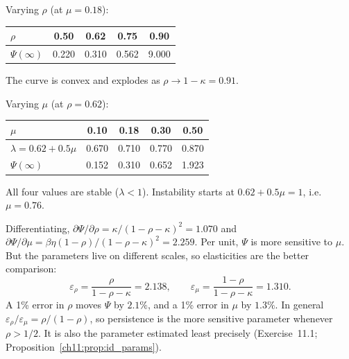 \documentclass[../solutions_manual.tex]{subfiles}
\begin{document}
 Varying $\rho$ (at $\mu = 0.18$):
\begin{center}
\begin{tabular}{lcccc}
\toprule
$\rho$ & 0.50 & 0.62 & 0.75 & 0.90 \\
\midrule
$\Psi(\infty)$ & 0.220 & 0.310 & 0.562 & 9.000 \\
\bottomrule
\end{tabular}
\end{center}
\begin{center}
\end{center}
The curve is convex and explodes as $\rho \to 1 - \kappa = 0.91$.

 Varying $\mu$ (at $\rho = 0.62$):
\begin{center}
\begin{tabular}{lcccc}
\toprule
$\mu$ & 0.10 & 0.18 & 0.30 & 0.50 \\
\midrule
$\lambda = 0.62 + 0.5\mu$ & 0.670 & 0.710 & 0.770 & 0.870 \\
$\Psi(\infty)$ & 0.152 & 0.310 & 0.652 & 1.923 \\
\bottomrule
\end{tabular}
\end{center}
All four values are stable ($\lambda < 1$). Instability starts at $0.62 + 0.5\mu = 1$, i.e.\ $\mu = 0.76$.

 Differentiating, $\partial\Psi/\partial\rho = \kappa/(1-\rho-\kappa)^2 = 1.070$ and $\partial\Psi/\partial\mu = \beta\eta(1-\rho)/(1-\rho-\kappa)^2 = 2.259$. Per unit, $\Psi$ is more sensitive to $\mu$. But the parameters live on different scales, so elasticities are the better comparison:
\[
\varepsilon_\rho = \frac{\rho}{1 - \rho - \kappa} = 2.138, \qquad \varepsilon_\mu = \frac{1-\rho}{1-\rho-\kappa} = 1.310 .
\]
A 1\% error in $\rho$ moves $\Psi$ by $2.1\%$, and a 1\% error in $\mu$ by $1.3\%$. In general $\varepsilon_\rho/\varepsilon_\mu = \rho/(1-\rho)$, so persistence is the more sensitive parameter whenever $\rho > 1/2$. It is also the parameter estimated least precisely (Exercise~11.1; Proposition~\ref{ch11:prop:id_params}).
\end{document}
